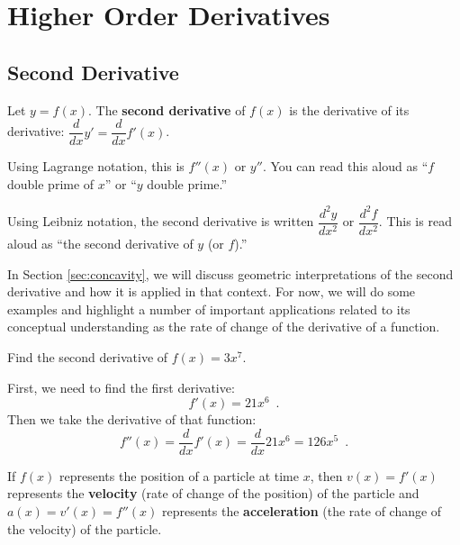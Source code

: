 \section{Higher Order Derivatives}
\label{sec:higherorder}

\subsection{Second Derivative}
\label{ssec:second-deriv}

\begin{definition}
Let $y=f(x)$. The {\bf second derivative} of $f(x)$ is the derivative of its derivative: $\dfrac{d}{dx}y'=\dfrac{d}{dx}f'(x)$.

Using Lagrange notation, this is $f''(x)$ or $y''$. You can read this aloud as ``$f$ double prime of $x$'' or ``$y$ double prime.''

Using Leibniz notation, the second derivative is written $\dfrac{d^2y}{dx^2}$ or $\dfrac{d^2f}{dx^2}$. This is read aloud as ``the second derivative of $y$ (or $f$).''
\end{definition}
In Section \ref{sec:concavity}, we will discuss geometric interpretations of the second derivative and how it is applied in that context. For now, we will do some examples and highlight a number of important applications related to its conceptual understanding as the rate of change of the derivative of a function.

\begin{example}
Find the second derivative of $f(x)=3x^7$.

\begin{solution} First, we need to find the first derivative:
$$f'(x)=21x^6 \enspace .$$
Then we take the derivative of that function:
$$f''(x)=\frac{d}{dx}f'(x) = \dfrac{d}{dx}21x^6=126x^5 \enspace .$$
\end{solution}\end{example}

\begin{definition}
If $f(x)$ represents the position of a particle at time $x$, then $v(x)=f'(x)$ represents the {\bf velocity} (rate of change of the position) of the particle and $a(x)=v'(x)=f''(x)$ represents the {\bf acceleration} (the rate of change of the velocity) of the particle.
\end{definition}

